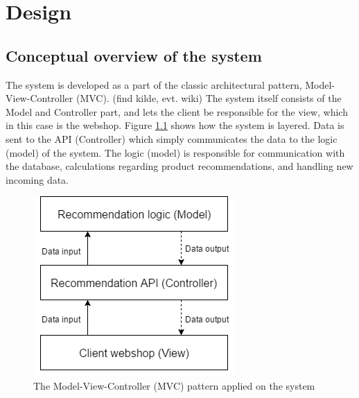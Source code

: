 
\chapter{Design} %

\label{Chapter3} %


\section{Conceptual overview of the system}
The system is developed as a part of the classic architectural pattern, Model-View-Controller (MVC).\color{red} (find kilde, evt. wiki) \color{black} The system itself consists of the Model and Controller part, and lets the client be responsible for the view, which in this case is the webshop. Figure \ref{fig:MVC} shows how the system is layered. Data is sent to the API (Controller) which simply communicates the data to the logic (model) of the system. The logic (model) is responsible for communication with the database, calculations regarding product recommendations, and handling new incoming data.

\begin{figure}
	\centering
	\includegraphics[width=.4\linewidth]{Figures/MVC.png}
	\caption{The Model-View-Controller (MVC) pattern applied on the system}
	\label{fig:MVC}
\end{figure}

